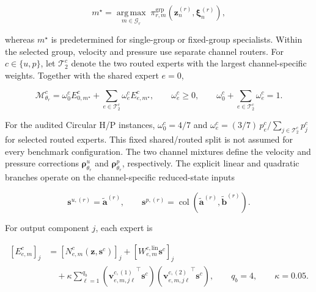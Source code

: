 \documentclass{article}
\begin{document}
\begin{equation}
  m^\star
  =
  \underset{m\in\mathcal G_r}{\operatorname{arg\,max}}
  \;
  \pi_{r,m}^{\mathrm{grp}}
  \left(
    \bm z_n^{(r)},\bm\xi_n^{(r)}
  \right),
  \label{eq:app_group_top1}
\end{equation}


whereas $m^\star$ is predetermined for single-group or fixed-group
specialists. Within the selected group, velocity and pressure use separate channel routers. For $c\in\{u,p\}$, let $\mathcal T_2^c$ denote the two routed experts with the largest channel-specific weights. Together with the shared expert $e=0$,


\begin{equation}
  \mathcal M_{\theta_r}^c
  =
  \omega_0^c
  E_{0,m^\star}^c
  +
  \sum_{e\in\mathcal T_2^c}
  \omega_e^c
  E_{e,m^\star}^c,
  \qquad
  \omega_e^c\ge0,
  \qquad
  \omega_0^c+\sum_{e\in\mathcal T_2^c}\omega_e^c=1.
  \label{eq:app_channel_sparse_moe}
\end{equation}


For the audited Circular H/P instances, $\omega_0^c=4/7$ and
$\omega_e^c=(3/7)\,p_e^c/\sum_{j\in\mathcal T_2^c}p_j^c$ for selected
routed experts. This fixed shared/routed split is not assumed for every
benchmark configuration.
The two channel mixtures define the velocity and pressure corrections
$\bm\rho_{\theta_r}^u$ and $\bm\rho_{\theta_r}^p$, respectively. The explicit linear and quadratic branches operate on the channel-specific reduced-state inputs


\begin{equation}
  \bm s^{u,(r)}
  =
  \widetilde{\bm a}^{(r)},
  \qquad
  \bm s^{p,(r)}
  =
  \operatorname{col}
  \left(
    \widetilde{\bm a}^{(r)},
    \widetilde{\bm b}^{(r)}
  \right).
  \label{eq:app_expert_state_slices}
\end{equation}


For output component $j$, each expert is


\begin{align}
  \left[E_{e,m}^c\right]_j
  &=
  \left[
    N_{e,m}^c
    \left(
      \bm z,\bm s^c
    \right)
  \right]_j
  +
  \left[
    W_{e,m}^{c,\mathrm{lin}}
    \bm s^c
  \right]_j
  \nonumber\\
  &\quad+
  \kappa
  \sum_{\ell=1}^{q_b}
  \left(
    {\bm v_{e,m,j\ell}^{c,(1)}}^{\top}
    \bm s^c
  \right)
  \left(
    {\bm v_{e,m,j\ell}^{c,(2)}}^{\top}
    \bm s^c
  \right),
  \qquad
  q_b=4,
  \qquad
  \kappa=0.05.
  \label{eq:app_structured_expert}
\end{align}
\end{document}
